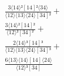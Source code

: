 \documentclass[varwidth, border=5pt]{standalone}
\begin{document}
\begin{my}
$\begin{gathered}
\scriptscriptstyle\frac{3⟨14⟩²[14]²⟨34⟩}{⟨12⟩⟨13⟩⟨24⟩[34]²} +\\
\scriptscriptstyle\frac{3⟨14⟩²[14]²}{⟨12⟩²[34]²} +\\
\scriptscriptstyle\frac{2⟨14⟩³[14]³}{⟨12⟩⟨13⟩⟨24⟩[34]³} +\\
\scriptscriptstyle\frac{6⟨13⟩⟨14⟩[14]⟨24⟩}{⟨12⟩³[34]} \phantom{+}
\end{gathered}$
\end{my}
\end{document}
